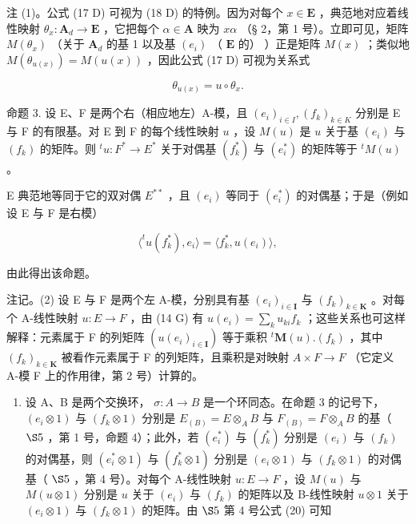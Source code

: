 注 (1)。公式 (17 D) 可视为 (18 D) 的特例。因为对每个 \(x \in \mathbf{E}\) ，典范地对应着线性映射 \(\theta_x: \mathbf{A}_d \to \mathbf{E}\) ，它把每个 \(\alpha \in \mathbf{A}\) 映为 \(x\alpha\) （§ 2，第 1 号）。立即可见，矩阵 \(M(\theta_x)\) （关于 \(\mathbf{A}_d\) 的基 1 以及基 \((e_i)\) （ \(\mathbf{E}\) 的） ）正是矩阵 \(M(x)\) ；类似地 \(M(\theta_{u(x)}) = M(u(x))\) ，因此公式 (17 D) 可视为关系式

\[
\theta_ {u (x)} = u \circ \theta_ {x}.
\]

命题 3. 设 E、F 是两个右（相应地左）A-模，且 \((e_i)_{i\in I}, (f_k)_{k\in K}\) 分别是 E 与 F 的有限基。对 E 到 F 的每个线性映射 \(u\) ，设 \(M(u)\) 是 \(u\) 关于基 \((e_i)\) 与 \((f_k)\) 的矩阵。则 \(^t u: F^* \to E^*\) 关于对偶基 \((f_k^*)\) 与 \((e_i^*)\) 的矩阵等于 \(^t M(u)\) 。

E 典范地等同于它的双对偶 \(E^{**}\) ，且 \((e_{i})\) 等同于 \((e_{i}^{*})\) 的对偶基；于是（例如设 E 与 F 是右模）

\[
\langle^ {t} u (f _ {k} ^ {*}), e _ {i} \rangle = \langle f _ {k} ^ {*}, u (e _ {i}) \rangle ,
\]

由此得出该命题。

注记。(2) 设 E 与 F 是两个左 A-模，分别具有基 \((e_{i})_{i\in\mathbf{I}}\) 与 \((f_{k})_{k\in\mathbf{K}}\) 。对每个 A-线性映射 \(u:E\to F\) ，由 (14 G) 有 \(u(e_{i})=\sum_{k}u_{ki}f_{k}\) ；这些关系也可这样解释：元素属于 F 的列矩阵 \((u(e_{i})_{i\in\mathbf{I}})\) 等于乘积 \({}^{t}\mathbf{M}(u).(f_{k})\) ，其中 \((f_{k})_{k\in\mathbf{K}}\) 被看作元素属于 F 的列矩阵，且乘积是对映射 \(A\times F\to F\) （它定义 A-模 F 上的作用律，第 2 号）计算的。

\begin{enumerate}
\def\labelenumi{(\arabic{enumi})}
\setcounter{enumi}{2}
\tightlist
\item
设 A、B 是两个交换环， \(\sigma: A \to B\) 是一个环同态。在命题 3 的记号下， \((e_i \otimes 1)\) 与 \((f_k \otimes 1)\) 分别是 \(E_{(B)} = E \otimes_A B\) 与 \(F_{(B)} = F \otimes_A B\) 的基（ \(\S 5\) ，第 1 号，命题 4）；此外，若 \((e_i^*)\) 与 \((f_k^*)\) 分别是 \((e_i)\) 与 \((f_k)\) 的对偶基，则 \((e_i^* \otimes 1)\) 与 \((f_k^* \otimes 1)\) 分别是 \((e_i \otimes 1)\) 与 \((f_k \otimes 1)\) 的对偶基（ \(\S 5\) ，第 4 号）。对每个 A-线性映射 \(u: E \to F\) ，设 \(M(u)\) 与 \(M(u \otimes 1)\) 分别是 \(u\) 关于 \((e_i)\) 与 \((f_k)\) 的矩阵以及 B-线性映射 \(u \otimes 1\) 关于 \((e_i \otimes 1)\) 与 \((f_k \otimes 1)\) 的矩阵。由 \(\S 5\) 第 4 号公式 (20) 可知
\end{enumerate}

